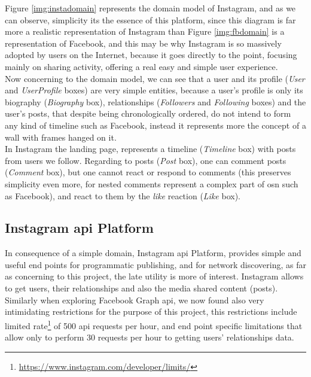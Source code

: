 Figure \ref{img:instadomain} represents the domain model of Instagram, and as we can observe, simplicity its the essence of this platform, since this diagram is far
more a realistic representation of Instagram than Figure \ref{img:fbdomain} is a representation of Facebook, and this may be why Instagram is so massively adopted by users
on the Internet, because it goes directly to the point, focusing mainly on sharing activity, offering a real easy and simple user experience.\\
\indent Now concerning to the domain model, we can see that a user and its profile (\textit{User} and \textit{UserProfile} boxes) are very simple entities, because
a user's profile is only its biography (\textit{Biography} box), relationships (\textit{Followers} and \textit{Following} boxes) and the user's posts, that despite
being chronologically ordered, do not intend to form any kind of timeline such as Facebook, instead it represents more the concept of a wall with frames hanged on it.\\
\indent In Instagram the landing page, represents a timeline (\textit{Timeline} box) with posts from users we follow. Regarding to posts (\textit{Post} box), one can
comment posts (\textit{Comment} box), but one cannot react or respond to comments (this preserves simplicity even more, for nested comments represent
 a complex part of \gls{osn} such as Facebook), and react to them by the \textit{like} reaction (\textit{Like} box).

\subsection*{Instagram \gls{api} Platform}
In consequence of a simple domain, Instagram \gls{api} Platform, provides simple and useful
end points for programmatic publishing, and for network discovering, as far as concerning to this project, the late utility
is more of interest. Instagram allows to get users, their relationships and also the media shared content (posts).\\
\indent Similarly when exploring Facebook Graph \gls{api}, we now found also very intimidating restrictions for the purpose of this project,
this restrictions include limited rate\footnote{\url{https://www.instagram.com/developer/limits/}} of 500 \gls{api} requests per hour, and end point specific limitations that allow only to
perform 30 requests per hour to getting users' relationships data.

